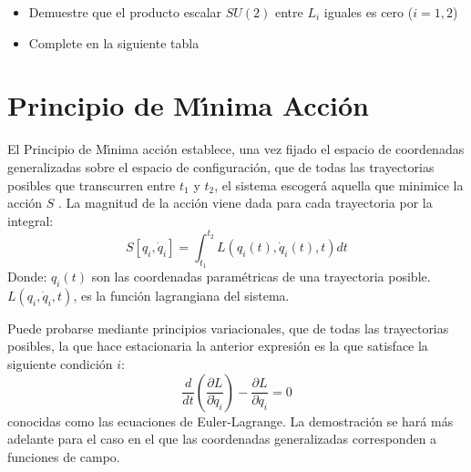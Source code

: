   \begin{itemize}
  \item Demuestre que el producto escalar $SU(2)$ entre $L_i$ iguales es cero ($i=1,2$) 
  \item   Complete en la siguiente tabla 
  \end{itemize}


\section{Principio de M\'\i nima Acci\'on}
\label{sec:la}

El Principio de M\'\i nima acci\'on establece, una vez fijado el espacio de
coordenadas generalizadas sobre el espacio de configuraci\'on, que de
todas las trayectorias posibles que transcurren entre $t_1$ y $t_2$,
el sistema escoger\'a aquella que minimice la acci\'on $S$
\cite{ActionPhysics}.  La magnitud de la acci\'on viene dada para cada
trayectoria por la integral:
\begin{equation}
  \label{eq:la}
   S\left[q_i,\dot{q}_i\right] = \int_{t_{1}}^{t_{2}} L(q_i(t), \dot{q}_i(t),t) dt
\end{equation}
Donde:
$q_i(t)$ son las coordenadas param\'etricas de una trayectoria posible.
$L(q_i,\dot{q}_i,t)$, es la funci\'on lagrangiana del sistema.


Puede probarse mediante principios variacionales, que de todas las trayectorias posibles, la que hace  estacionaria la anterior expresi\'on es la que satisface la siguiente condici\'on $i$:
\begin{equation}
  \label{eq:eel}
 \frac{d}{dt} \left ( \frac{\partial L}{\partial\dot{q}_i} \right ) - \frac{\partial L}{\partial q_i} = 0
\end{equation}
conocidas como las ecuaciones de Euler-Lagrange. La demostraci\'on se
har\'a m\'as adelante para el caso en el que las coordenadas generalizadas
corresponden a funciones de campo. 

